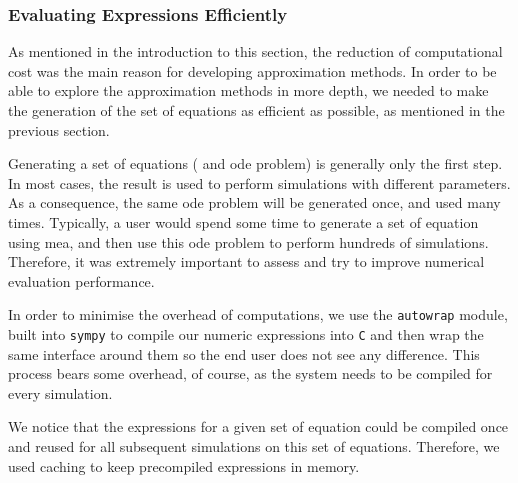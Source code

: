 

\subsubsection{Evaluating Expressions Efficiently}
\label{sec:evaluating_expressions_efficiently}

As mentioned in the introduction to this section, the reduction of computational cost was the main reason for developing approximation methods.
In order to be able to explore the approximation methods in more depth,
we needed to make the generation of the set of equations as efficient as possible, as mentioned in the previous section.

Generating a set of equations (\ie{} and \gls{ode} problem) is generally only the first step.
In most cases, the result is used to perform simulations with different parameters.
As a consequence, the same \gls{ode} problem will be generated once, and used many times.
Typically, a user would spend some time to generate a set of equation using \gls{mea}, and then use this \gls{ode} problem to perform hundreds of simulations.
Therefore, it was extremely important to assess and try to improve numerical evaluation performance.
 


In order to minimise the overhead of computations, we use the {\tt autowrap} module, built into {\tt sympy} to compile our numeric expressions into \texttt{C}
and then wrap the same \py{} interface around them so the end user does not see any difference.
This process bears some overhead, of course, as the system needs to be compiled for every simulation.

We notice that the expressions for a given set of equation could be compiled once and reused for all subsequent simulations on this set of equations.
Therefore, we used caching to keep precompiled expressions in memory.
 
